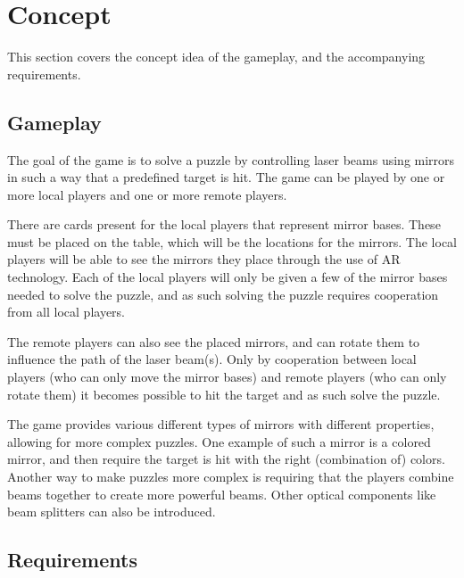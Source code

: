 \section{Concept}
This section covers the concept idea of the gameplay, and the accompanying
requirements.

\subsection{Gameplay}
The goal of the game is to solve a puzzle by controlling laser beams using mirrors
in such a way that a predefined target is hit. The game can be played by 
one or more local players and one or more remote players.

There are cards present for the local players that represent mirror bases. These 
must be placed on the table, which will be the locations for the mirrors. The local
players will be able to see the mirrors they place through the use of AR technology.
Each of the local players will only be given a few of the mirror bases needed to solve
the puzzle, and as such solving the puzzle requires cooperation from all local players.

The remote players can also see the placed mirrors, and can rotate them to influence 
the path of the laser beam(s). Only by cooperation between local players (who can
only move the mirror bases) and remote players (who can only rotate them) it becomes
possible to hit the target and as such solve the puzzle.

The game provides various different types of mirrors with different properties, 
allowing for more complex puzzles. One example of such a mirror is a colored mirror, 
and then require the target is hit with the right (combination of) colors. Another 
way to make puzzles more complex is requiring that the players combine beams together
to create more powerful beams. Other optical components like beam splitters can
also be introduced.

\subsection{Requirements}

